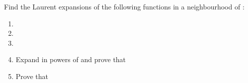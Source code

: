 \begin{EMexercise}{}

Find the Laurent expansions of the following functions in a neighbourhood of :

\begin{enumerate}
\def\labelenumi{\arabic{enumi}.}
\tightlist
\item
\item
\item
\item
  Expand  in powers of  and prove that 
\item
  Prove that 
\end{enumerate}

\end{EMexercise}

\EMhold


